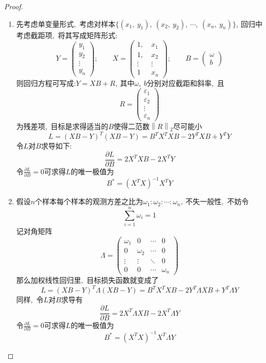 	\begin{proof}
		\begin{enumerate}
			\item 先考虑单变量形式,\ 考虑对样本$\{(x_1,\ y_1),\ (x_2,\ y_2),\ \cdots,\ (x_n,\ y_n)\},\ $回归中考虑截距项,\ 将其写成矩阵形式:
			$$Y=\left(\begin{matrix}
						y_1      \\
						y_2     \\
						\vdots\\
						y_n    
					\end{matrix}\right);\qquad X=\left(\begin{matrix}
					1,\    &  x_1\\
					1,\    &  x_2\\
					\vdots& \vdots \\
					1   &   x_n
				\end{matrix}\right);\qquad B=\left(\begin{matrix}
				\omega     \\
				b     
			\end{matrix}\right)$$
		则回归方程可写成:$Y=XB+R,\ $其中$\omega,\ b$分别对应截距和斜率,\ 且
		$$R=\left(\begin{matrix}
			\varepsilon_1      \\
			\varepsilon_2     \\
			\vdots \\
			\varepsilon_n   
		\end{matrix}\right)$$
		为残差项,\ 目标是求得适当的$B$使得二范数$\left \|  R\right \|_2 $尽可能小
		$$L=(XB-Y)^T(XB-Y)=B^TX^TXB-2Y^TXB+Y^TY$$
		令$L$对$B$求导如下:
		$$\frac{\partial L}{\partial B}=2X^TXB-2X^TY$$
		令$\frac{\partial L}{\partial B}=0$可求得$L$的唯一极值为
		$$B^*=(X^TX)^{-1}X^TY$$
		\item 假设$n$个样本每个样本的观测方差之比为$\omega_{1}:\omega_{2}:\cdots:\omega_n,\ $不失一般性,\ 不妨令
		$$\sum_{i=1}^{n}\omega_i = 1$$
		记对角矩阵
		$$\Lambda = \left(\begin{matrix}
			\omega_{1} & 0 & \cdots & 0\\
			0 & \omega_2 & \cdots & 0\\
			\vdots & \vdots & \ddots & 0\\
			0 & 0 & \cdots & \omega_n
		\end{matrix}\right)$$
		那么加权线性回归里,\ 目标损失函数就变成了
		$$L=(XB-Y)^T\Lambda(XB-Y)=B^TX^TXB-2Y^T\Lambda XB+Y^T\Lambda Y$$
		同样,\ 令$L$对$B$求导有
		$$\frac{\partial L}{\partial B}=2X^T\Lambda XB-2X^T\Lambda Y$$
		令$\frac{\partial L}{\partial B}=0$可求得$L$的唯一极值为
		$$B^*=(X^TX)^{-1}X^T\Lambda Y$$
		\end{enumerate}
	\end{proof}
	\newpage
